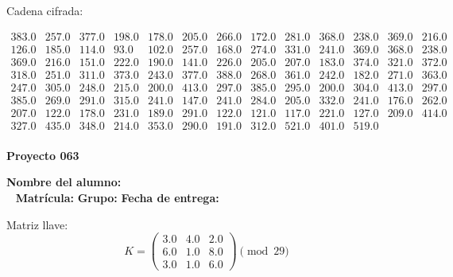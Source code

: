 \documentclass[12pt]{article}
\begin{document}
Cadena cifrada:
\begin{center}
$\begin{array}{lllllllllllll}
383.0 & 257.0 & 377.0 & 198.0 & 178.0 & 205.0 & 266.0 & 172.0 & 281.0 & 368.0 & 238.0 & 369.0 & 216.0\\
126.0 & 185.0 & 114.0 & 93.0 & 102.0 & 257.0 & 168.0 & 274.0 & 331.0 & 241.0 & 369.0 & 368.0 & 238.0\\
369.0 & 216.0 & 151.0 & 222.0 & 190.0 & 141.0 & 226.0 & 205.0 & 207.0 & 183.0 & 374.0 & 321.0 & 372.0\\
318.0 & 251.0 & 311.0 & 373.0 & 243.0 & 377.0 & 388.0 & 268.0 & 361.0 & 242.0 & 182.0 & 271.0 & 363.0\\
247.0 & 305.0 & 248.0 & 215.0 & 200.0 & 413.0 & 297.0 & 385.0 & 295.0 & 200.0 & 304.0 & 413.0 & 297.0\\
385.0 & 269.0 & 291.0 & 315.0 & 241.0 & 147.0 & 241.0 & 284.0 & 205.0 & 332.0 & 241.0 & 176.0 & 262.0\\
207.0 & 122.0 & 178.0 & 231.0 & 189.0 & 291.0 & 122.0 & 121.0 & 117.0 & 221.0 & 127.0 & 209.0 & 414.0\\
327.0 & 435.0 & 348.0 & 214.0 & 353.0 & 290.0 & 191.0 & 312.0 & 521.0 & 401.0 & 519.0\\
\end{array}$
\end{center}

\newpage


\textbf{Proyecto 063}

\textbf{Nombre del alumno:} \underline{\hspace{13cm}}\\\
\vspace{1cm}
\textbf{Matrícula:} \underline{\hspace{4cm}} \hspace{1cm}
\textbf{Grupo:} \underline{\hspace{2cm}}
\textbf{Fecha de entrega:} \underline{\hspace{2cm}}

\medskip

Matriz llave:
\[
K = \begin{pmatrix}
3.0 & 4.0 & 2.0\\
6.0 & 1.0 & 8.0\\
3.0 & 1.0 & 6.0
\end{pmatrix} \pmod{29}
\]
\end{document}
